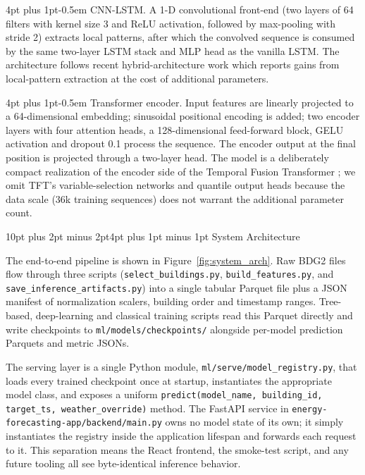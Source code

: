 \documentclass[12pt,a4paper,openany]{report}
\makeatletter
\renewcommand{\section}{\@startsection{section}{1}{\z@}%
  {10pt plus 2pt minus 2pt}{4pt plus 1pt minus 1pt}%
  {\normalfont\normalsize\bfseries}}
\renewcommand{\paragraph}{\@startsection{paragraph}{4}{\z@}%
  {4pt plus 1pt}{-0.5em}%
  {\normalfont\normalsize\itshape}}
\makeatother
\begin{document}
\paragraph{CNN-LSTM.} A 1-D convolutional front-end (two layers of 64 filters with kernel size 3 and ReLU activation, followed by max-pooling with stride 2) extracts local patterns, after which the convolved sequence is consumed by the same two-layer LSTM stack and MLP head as the vanilla LSTM. The architecture follows recent hybrid-architecture work \cite{ref_kim_cnnlstm} which reports gains from local-pattern extraction at the cost of additional parameters.

\paragraph{Transformer encoder.} Input features are linearly projected to a 64-dimensional embedding; sinusoidal positional encoding is added; two encoder layers with four attention heads, a 128-dimensional feed-forward block, GELU activation and dropout 0.1 process the sequence. The encoder output at the final position is projected through a two-layer head. The model is a deliberately compact realization of the encoder side of the Temporal Fusion Transformer \cite{ref_lim_tft}; we omit TFT's variable-selection networks and quantile output heads because the data scale (36k training sequences) does not warrant the additional parameter count.

\section{System Architecture}

The end-to-end pipeline is shown in Figure~\ref{fig:system_arch}. Raw BDG2 files flow through three scripts (\texttt{select\_buildings.py}, \texttt{build\_features.py}, and \texttt{save\_inference\_artifacts.py}) into a single tabular Parquet file plus a JSON manifest of normalization scalers, building order and timestamp ranges. Tree-based, deep-learning and classical training scripts read this Parquet directly and write checkpoints to \texttt{ml/models/checkpoints/} alongside per-model prediction Parquets and metric JSONs.

The serving layer is a single Python module, \texttt{ml/serve/model\_registry.py}, that loads every trained checkpoint once at startup, instantiates the appropriate model class, and exposes a uniform \texttt{predict(model\_name, building\_id, target\_ts, weather\_override)} method. The FastAPI service in \texttt{energy-forecasting-app/backend/main.py} owns no model state of its own; it simply instantiates the registry inside the application lifespan and forwards each request to it. This separation means the React frontend, the smoke-test script, and any future tooling all see byte-identical inference behavior.
\end{document}
